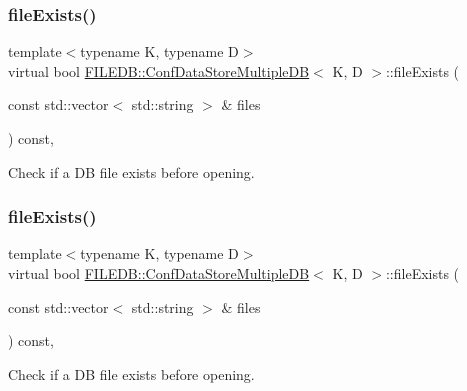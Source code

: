 \subsubsection{\texorpdfstring{fileExists()}{fileExists()}\hspace{0.1cm}{\footnotesize\ttfamily [2/3]}}
{\footnotesize\ttfamily template$<$typename K, typename D$>$ \\
virtual bool \mbox{\hyperlink{classFILEDB_1_1ConfDataStoreMultipleDB}{F\+I\+L\+E\+D\+B\+::\+Conf\+Data\+Store\+Multiple\+DB}}$<$ K, D $>$\+::file\+Exists (\begin{DoxyParamCaption}\item[{const std\+::vector$<$ std\+::string $>$ \&}]{files }\end{DoxyParamCaption}) const\hspace{0.3cm}{\ttfamily [inline]}, {\ttfamily [virtual]}}

Check if a DB file exists before opening. \mbox{\label{classFILEDB_1_1ConfDataStoreMultipleDB_a85c71818db3a3b0a5a67b4dabaed2ff7}} 
\subsubsection{\texorpdfstring{fileExists()}{fileExists()}\hspace{0.1cm}{\footnotesize\ttfamily [3/3]}}
{\footnotesize\ttfamily template$<$typename K, typename D$>$ \\
virtual bool \mbox{\hyperlink{classFILEDB_1_1ConfDataStoreMultipleDB}{F\+I\+L\+E\+D\+B\+::\+Conf\+Data\+Store\+Multiple\+DB}}$<$ K, D $>$\+::file\+Exists (\begin{DoxyParamCaption}\item[{const std\+::vector$<$ std\+::string $>$ \&}]{files }\end{DoxyParamCaption}) const\hspace{0.3cm}{\ttfamily [inline]}, {\ttfamily [virtual]}}

Check if a DB file exists before opening. \mbox{\label{classFILEDB_1_1ConfDataStoreMultipleDB_a15c985c05120d6076e890f0507ceade7}} 
